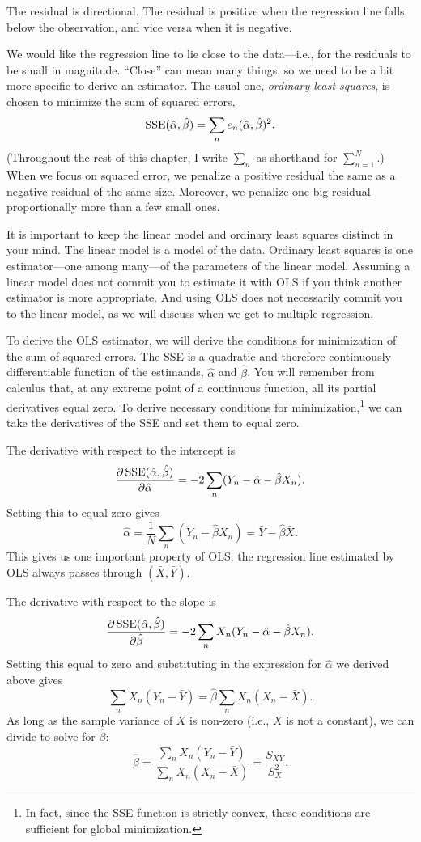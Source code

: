 \documentclass[12pt,oneside,openany]{book}
\let\rmarkdownfootnote\footnote%
\def\footnote{\protect\rmarkdownfootnote}
\begin{document}
The residual is directional. The residual is positive when the
regression line falls below the observation, and vice versa when it is
negative.

We would like the regression line to lie close to the data---i.e., for
the residuals to be small in magnitude. ``Close'' can mean many things,
so we need to be a bit more specific to derive an estimator. The usual
one, \emph{ordinary least squares}, is chosen to minimize the sum of
squared errors, \[
\mathop{\rm SSE}\nolimits(\hat{\alpha}, \hat{\beta}) = \sum_n e_n(\hat{\alpha}, \hat{\beta})^2.
\] (Throughout the rest of this chapter, I write \(\sum_n\) as shorthand
for \(\sum_{n=1}^N\).) When we focus on squared error, we penalize a
positive residual the same as a negative residual of the same size.
Moreover, we penalize one big residual proportionally more than a few
small ones.

It is important to keep the linear model and ordinary least squares
distinct in your mind. The linear model is a model of the data. Ordinary
least squares is one estimator---one among many---of the parameters of
the linear model. Assuming a linear model does not commit you to
estimate it with OLS if you think another estimator is more appropriate.
And using OLS does not necessarily commit you to the linear model, as we
will discuss when we get to multiple regression.

To derive the OLS estimator, we will derive the conditions for
minimization of the sum of squared errors. The SSE is a quadratic and
therefore continuously differentiable function of the estimands,
\(\hat{\alpha}\) and \(\hat{\beta}\). You will remember from calculus
that, at any extreme point of a continuous function, all its partial
derivatives equal zero. To derive necessary conditions for
minimization,\footnote{In fact, since the SSE function is strictly
  convex, these conditions are sufficient for global minimization.} we
can take the derivatives of the SSE and set them to equal zero.

The derivative with respect to the intercept is \[
\frac{\partial \mathop{\rm SSE}\nolimits(\hat{\alpha}, \hat{\beta})}{\partial \hat{\alpha}}
= -2 \sum_n (Y_n - \hat{\alpha} - \hat{\beta} X_n).
\] Setting this to equal zero gives \[
\hat{\alpha}
= \frac{1}{N} \sum_n (Y_n - \hat{\beta} X_n)
= \bar{Y} - \hat{\beta} \bar{X}.
\] This gives us one important property of OLS: the regression line
estimated by OLS always passes through \((\bar{X}, \bar{Y})\).

The derivative with respect to the slope is \[
\frac{\partial \mathop{\rm SSE}\nolimits(\hat{\alpha}, \hat{\beta})}{\partial \hat{\beta}}
= -2 \sum_n X_n (Y_n - \hat{\alpha} - \hat{\beta} X_n).
\] Setting this equal to zero and substituting in the expression for
\(\hat{\alpha}\) we derived above gives \[
\sum_n X_n (Y_n - \bar{Y}) = \hat{\beta} \sum_n X_n (X_n - \bar{X}).
\] As long as the sample variance of \(X\) is non-zero (i.e., \(X\) is
not a constant), we can divide to solve for \(\hat{\beta}\): \[
\hat{\beta}
= \frac{\sum_n X_n (Y_n - \bar{Y})}{\sum_n X_n (X_n - \bar{X})}
= \frac{S_{XY}}{S_X^2}.
\]
\end{document}
